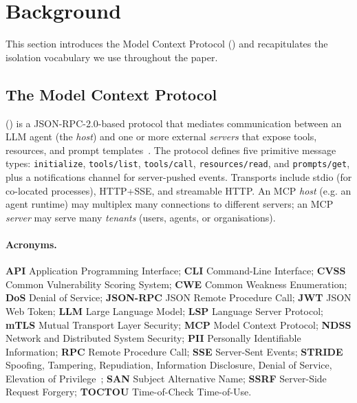 
\section{Background}\label{sec:background}

This section introduces the Model Context Protocol (\mcp{}) and
recapitulates the isolation vocabulary we use throughout the paper.

\subsection{The Model Context Protocol}

\mcp{} (\mcp{}) is a JSON-RPC-2.0-based protocol that mediates
communication between an LLM agent (the \emph{host}) and one or
more external \emph{servers} that expose tools, resources, and
prompt templates~\cite{mcp_spec}. The protocol defines five
primitive message types:
\texttt{initialize}, \texttt{tools/list},
\texttt{tools/call}, \texttt{resources/read}, and
\texttt{prompts/get}, plus a notifications channel for
server-pushed events. Transports include stdio (for
co-located processes), HTTP+SSE, and streamable HTTP. An MCP
\emph{host} (e.g. an agent runtime) may multiplex many
connections to different servers; an MCP \emph{server} may serve
many \emph{tenants} (users, agents, or organisations).

\paragraph{Acronyms.}
\textbf{API} Application Programming Interface; \textbf{CLI}
Command-Line Interface; \textbf{CVSS} Common Vulnerability
Scoring System; \textbf{CWE} Common Weakness Enumeration;
\textbf{DoS} Denial of Service; \textbf{JSON-RPC} JSON Remote
Procedure Call; \textbf{JWT} JSON Web Token; \textbf{LLM} Large
Language Model; \textbf{LSP} Language Server Protocol;
\textbf{mTLS} Mutual Transport Layer Security; \textbf{MCP} Model
Context Protocol; \textbf{NDSS} Network and Distributed System
Security; \textbf{PII} Personally Identifiable Information;
\textbf{RPC} Remote Procedure Call; \textbf{SSE} Server-Sent
Events; \textbf{STRIDE} Spoofing, Tampering, Repudiation,
Information Disclosure, Denial of Service, Elevation of
Privilege~\cite{stride_orig}; \textbf{SAN} Subject Alternative
Name; \textbf{SSRF} Server-Side Request Forgery;
\textbf{TOCTOU} Time-of-Check Time-of-Use.

